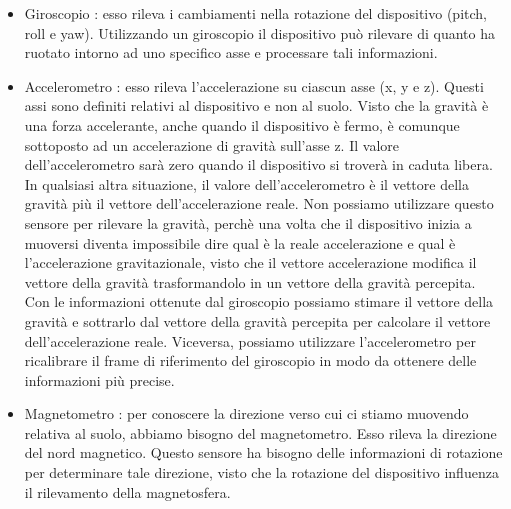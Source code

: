\begin{itemize}
    \item Giroscopio : esso rileva i cambiamenti nella rotazione del dispositivo (pitch, roll e yaw). Utilizzando un giroscopio il dispositivo può rilevare di quanto ha ruotato intorno ad uno specifico asse e processare tali informazioni.
    \item Accelerometro : esso rileva l’accelerazione su ciascun asse (x, y e z). Questi assi sono definiti relativi al dispositivo e non al suolo. Visto che la gravità è una forza accelerante, anche quando il dispositivo è fermo, è comunque sottoposto ad un accelerazione di gravità sull’asse z. Il valore dell’accelerometro sarà zero quando il dispositivo si troverà in caduta libera. In qualsiasi altra situazione, il valore dell’accelerometro è il vettore della gravità più il vettore dell’accelerazione reale. Non possiamo utilizzare questo sensore per rilevare la gravità, perchè una volta che il dispositivo inizia a muoversi diventa impossibile dire qual è la reale accelerazione e qual è l’accelerazione gravitazionale, visto che il vettore accelerazione modifica il vettore della gravità trasformandolo in un vettore della gravità percepita. Con le informazioni ottenute dal giroscopio possiamo stimare il vettore della gravità e sottrarlo dal vettore della gravità percepita per calcolare il vettore dell’accelerazione reale. Viceversa, possiamo utilizzare l’accelerometro per ricalibrare il frame di riferimento del giroscopio in modo da ottenere delle informazioni più precise.
    \item Magnetometro : per conoscere la direzione verso cui ci stiamo muovendo relativa al suolo, abbiamo bisogno del magnetometro. Esso rileva la direzione del nord magnetico. Questo sensore ha bisogno delle informazioni di rotazione per determinare tale direzione, visto che la rotazione del dispositivo influenza il rilevamento della magnetosfera.
\end{itemize}

